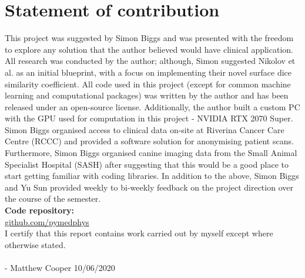 \chapter{Statement of contribution}
\label{ch:contribution}

This project was suggested by Simon Biggs and was presented with the freedom to
explore any solution that the author believed would have clinical application.
All research was conducted by the author; although, Simon suggested Nikolov et
al. as an initial blueprint, with a focus on implementing their novel surface
dice similarity coefficient. All code used in this project (except for common
machine learning and computational packages) was written by the author and has
been released under an open-source license. Additionally, the author built a
custom PC with the GPU used for computation in this project - NVIDIA RTX 2070
Super. Simon Biggs organised access to clinical data on-site at Riverina Cancer
Care Centre (RCCC) and provided a software solution for anonymising patient
scans. Furthermore, Simon Biggs organised canine imaging data from the Small
Animal Specialist Hospital (SASH) after suggesting that this would be a good
place to start getting familiar with coding libraries. In addition to the above,
Simon Biggs and Yu Sun provided weekly to bi-weekly feedback on the project
direction over the course of the semester. \\


\textbf{Code repository:} \\
\href{https://github.com/pymedphys/pymedphys}{github.com/pymedphys} \\



I certify that this report contains work carried out by myself except where otherwise
stated.
\\
\\
- Matthew Cooper     10/06/2020
\\
\\

